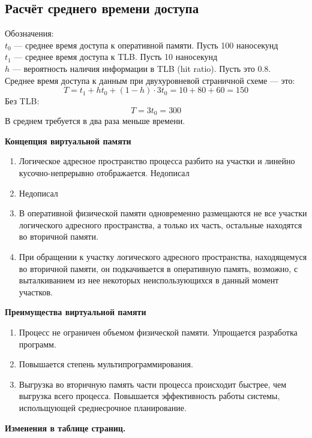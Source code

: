 \documentclass[12pt, a4paper]{article}
\begin{document}
    \subsection*{Расчёт среднего времени доступа}
    Обозначения:\\
    $t_0$ --- среднее время доступа к оперативной памяти. Пусть 100 наносекунд\\
    $t_1$ --- среднее время доступа к TLB. Пусть 10 наносекунд\\
    $h$ --- вероятность наличия информации в TLB (hit ratio). Пусть это 0.8.\\
    Среднее время доступа к данным при двухуровневой страничной схеме --- это:
    \[T = t_1 + ht_0 + (1 - h)\cdot 3t_0 = 10 + 80 + 60 = 150\]
    Без TLB:
    \[T = 3t_0 = 300\]
    В среднем требуется в два раза меньше времени.
    \begin{center}
        \bf Концепция виртуальной памяти
    \end{center}
    \begin{enumerate}
        \item Логическое адресное пространство процесса разбито на участки и линейно кусочно-непрерывно отображается. Недописал
        \item Недописал
        \item В оперативной физической памяти одновременно размещаются не все участки логического адресного пространства, а только их часть, остальные находятся во вторичной памяти.
        \item При обращении к участку логического адресного пространства, находящемуся во вторичной памяти, он подкачивается в оперативную память, возможно, с выталкиванием из нее некоторых неиспользующихся в данный момент участков.
    \end{enumerate}
    \begin{center}
        \bf Преимущества виртуальной памяти
    \end{center}
    \begin{enumerate}
        \item Процесс не ограничен объемом физической памяти. Упрощается разработка программ.
        \item Повышается степень мультипрограммирования.
        \item Выгрузка во вторичную память части процесса происходит быстрее, чем выгрузка всего процесса. Повышается эффективность работы системы, испольщующей среднесрочное планирование.
    \end{enumerate}
    \begin{center}
        \bf Изменения в таблице страниц.
    \end{center}
\end{document}
